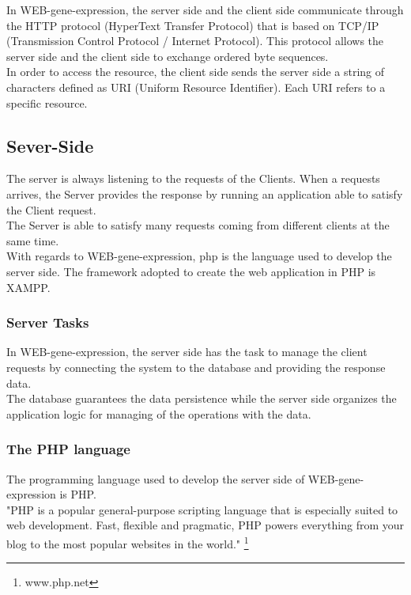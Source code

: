 \documentclass[a4paper]{report}
\begin{document}
In WEB-gene-expression, the server side and the client side communicate through the HTTP protocol (HyperText Transfer Protocol) that is based on TCP/IP (Transmission Control Protocol / Internet Protocol). This protocol allows the server side and the client side to exchange ordered byte sequences.
\\In order to access the resource, the client side sends the server side a string of characters defined as URI (Uniform Resource Identifier). Each URI refers to a specific resource.

\subsection{Sever-Side}\label{serverside}

The server is always listening to the requests of the Clients. When a requests arrives, the Server provides the response by running an application able to satisfy the Client request.\\
The Server is able to satisfy many requests coming from different clients at the same time.\\
With regards to WEB-gene-expression, php is the language used to develop the server side. The framework adopted to create the web application in PHP is XAMPP.


\subsubsection{Server Tasks} 
In WEB-gene-expression, the server side has the task to manage the client requests by connecting the system to the database and providing the response data. \\
The database guarantees the data persistence while the server side organizes the application logic for managing of the operations with the data.\\

\subsubsection{The PHP language}\label{php}

The programming language used to develop the server side of WEB-gene-expression is PHP.\\

"PHP is a popular general-purpose scripting language that is especially suited to web development. Fast, flexible and pragmatic, PHP powers everything from your blog to the most popular websites in the world." \footnote{www.php.net}
\end{document}
